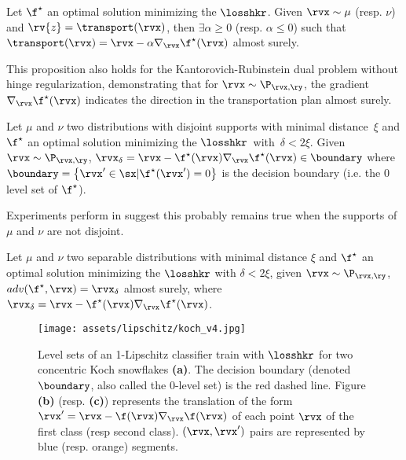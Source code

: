 \begin{theorem}\label{th:gradient_transport_plan}
Let $\f^\star$ an optimal solution minimizing the $\losshkr$. Given $\rvx \sim \mu$ (resp. $\nu$)  and  $\rv{z} = \transport(\rvx)$, then $\exists \alpha \geq 0$ (resp. $\alpha \leq 0$) such that $\transport(\rvx) = \rvx  -\alpha \nabla_{\rvx}  \f^\star(\rvx)$ almost surely. 
\end{theorem}

This proposition also holds for the Kantorovich-Rubinstein dual problem without hinge regularization, demonstrating that for $\rvx \sim \P_{\rvx,\ry}$, the gradient $\nabla_{\rvx} \f^{\star}(\rvx)$ indicates the direction in the transportation plan almost surely.

\begin{theorem}\label{boundary_distance}
Let $\mu$ and $\nu$ two distributions with disjoint supports with minimal distance~$\xi$ and  $\f^\star$ an optimal solution minimizing the $\losshkr$~with~$\delta < 2\xi$. Given $\rvx \sim \P_{\rvx,\ry}$, $\rvx_\delta = \rvx -\f^\star(\rvx) \nabla_{\rvx} \f^\star(\rvx) \in \boundary $
where $\boundary = \left\{\rvx' \in \sx | \f^\star(\rvx') = 0 \right\}$  is the decision boundary (i.e. the 0 level set of $\f^\star$).
\end{theorem}

Experiments perform in \cite{serrurier2024explainable} suggest this probably remains true when the supports of $\mu$ and $\nu$  are not disjoint. 

\begin{corollary}\label{fx_grad_adversarial}
Let $\mu$ and $\nu$ two separable distributions with minimal distance $\xi$ and  $\f^\star$ an optimal solution minimizing the $\losshkr$ with $\delta <2\xi$, given $\rvx \sim \P_{\rvx, \ry}$, 
$adv(\f^\star,\rvx) = \rvx_{\delta}$ 
almost surely, where $\rvx_\delta = \rvx -\f^\star(\rvx) \nabla_{\rvx} \f^\star(\rvx)$.
\end{corollary}

\begin{figure*}[ht]
    \centering
    \texttt{[image: assets/lipschitz/koch\_v4.jpg]}
    \caption{Level sets of an 1-Lipschitz classifier train with $\losshkr$ for two concentric Koch snowflakes \textbf{(a)}.  The decision boundary (denoted $\boundary$, also called the 0-level set) is the red dashed line. Figure \textbf{(b)} (resp. \textbf{(c)}) represents the translation of the form $\rvx'= \rvx -\f(\rvx)\nabla_{\rvx} \f(\rvx)$ of each point $\rvx$ of the first class (resp second class). 
    $(\rvx,\rvx')$ pairs are represented by blue (resp. orange)  segments.}
    \label{fig:lipschitz:koch}
\end{figure*}

